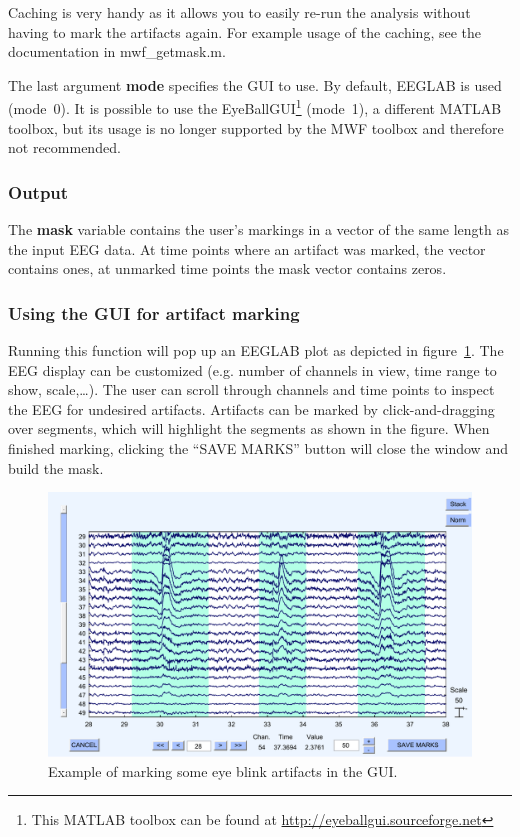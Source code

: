 \documentclass[11pt]{article}
\begin{document}
Caching is very handy as it allows you to easily re-run the analysis without having to mark the artifacts again. For example usage of the caching, see the documentation in mwf\_getmask.m.

The last argument \textbf{mode} specifies the GUI to use. By default, EEGLAB is used (mode~0). It is possible to use the EyeBallGUI\footnote{This MATLAB toolbox can be found at \url{http://eyeballgui.sourceforge.net}} (mode~1), a different MATLAB toolbox, but its usage is no longer supported by the MWF toolbox and therefore not recommended.

\subsubsection{Output}

The \textbf{mask} variable contains the user's markings in a vector of the same length as the input EEG data. At time points where an artifact was marked, the vector contains ones, at unmarked time points the mask vector contains zeros.

\subsubsection{Using the GUI for artifact marking}

Running this function will pop up an EEGLAB plot as depicted in figure~\ref{fig:getmask}. The EEG display can be customized (e.g. number of channels in view, time range to show, scale,\ldots). The user can scroll through channels and time points to inspect the EEG for undesired artifacts. Artifacts can be marked by click-and-dragging over segments, which will highlight the segments as shown in the figure. When finished marking, clicking the ``SAVE MARKS'' button will close the window and build the mask.

\begin{figure}[h]
    \centering
    \includegraphics[width=.9\textwidth]{fig_getmask.pdf}
    \caption{Example of marking some eye blink artifacts in the GUI.}
    \label{fig:getmask}
\end{figure}
\end{document}
